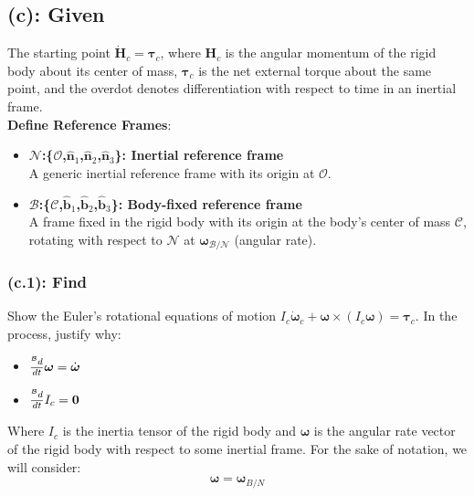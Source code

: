 \documentclass[titlepage]{article}
\begin{document}
\subsection*{(c): Given}
The starting point $\dot{\boldsymbol{H}}_c = \boldsymbol{\tau}_c$, where $\boldsymbol{H}_c$ is the angular momentum of the rigid body about its center of mass, $\boldsymbol{\tau}_c$ is the net external torque about the same point, and the overdot denotes differentiation with respect to time in an inertial frame.\\

\textbf{Define Reference Frames}:
\begin{itemize}
	\item \textbf{$\mathcal{N}$:\{$\mathcal{O}$,$\hat{\boldsymbol{n}}_1$,$\hat{\boldsymbol{n}}_2$,$\hat{\boldsymbol{n}}_3$\}: Inertial reference frame\\}A generic inertial reference frame with its origin at $\mathcal{O}$.
	\item \textbf{$\mathcal{B}$:\{$\mathcal{C}$,$\hat{\boldsymbol{b}}_1$,$\hat{\boldsymbol{b}}_2$,$\hat{\boldsymbol{b}}_3$\}: Body-fixed reference frame\\}A frame fixed in the rigid body with its origin at the body's center of mass $\mathcal{C}$, rotating with respect to $\mathcal{N}$ at $\boldsymbol{\omega}_{\mathcal{B}/\mathcal{N}}$ (angular rate).
\end{itemize}

\subsubsection*{(c.1): Find}
Show the Euler's rotational equations of motion $I_c\dot{\boldsymbol{\omega}}_c+\boldsymbol{\omega}\times(I_c\boldsymbol{\omega})=\boldsymbol{\tau}_c$. In the process, justify why:
\begin{itemize}
	\item $\frac{\prescript{\mathcal{B}}{}{d}}{dt}\boldsymbol{\omega}=\dot{\boldsymbol{\omega}}$
	\item $\frac{\prescript{\mathcal{B}}{}{d}}{dt}I_c=\boldsymbol{0}$
\end{itemize}
Where $I_c$ is the inertia tensor of the rigid body and $\boldsymbol{\omega}$ is the angular rate vector of the rigid body with respect to some inertial frame. For the sake of notation, we will consider:
\begin{equation}
	\boldsymbol{\omega}=\boldsymbol{\omega}_{B/N}
\end{equation}
\end{document}

